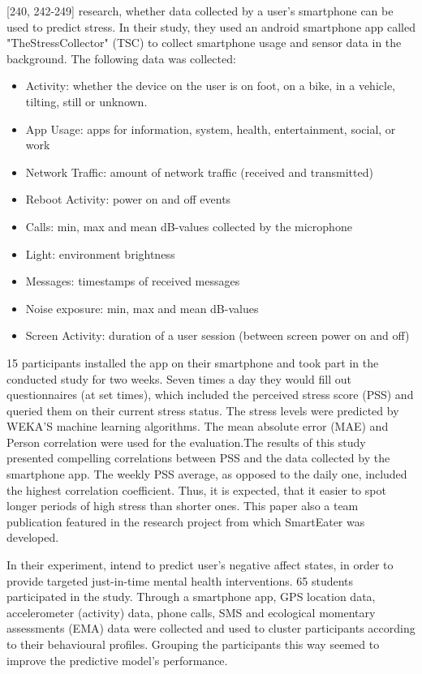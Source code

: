 \textcite{SmartphoneBasedStressPrediction2015}[240, 242-249] research, whether data collected by a user's smartphone can be used to predict stress. In their study, they used an android smartphone app called "TheStressCollector" (TSC) to collect smartphone usage and sensor data in the background. The following data was collected:
\begin{itemize}
  \item Activity: whether the device on the user is on foot, on a bike, in a vehicle, tilting, still or unknown.
  \item App Usage: apps for information, system, health, entertainment, social, or work
  \item Network Traffic: amount of network traffic (received and transmitted)
  \item Reboot Activity: power on and off events
  \item Calls: min, max and mean dB-values collected by the microphone
  \item Light: environment brightness
  \item Messages: timestamps of received messages
  \item Noise exposure: min, max and mean dB-values
  \item Screen Activity: duration of a user session (between screen power on and off)
\end{itemize}

15 participants installed the app on their smartphone and took part in the conducted study for two weeks. Seven times a day they would fill out questionnaires (at set times), which included the perceived stress score (PSS) and queried them on their current stress status. The stress levels were predicted by WEKA'S machine learning algorithms. The mean absolute error (MAE) and Person correlation were used for the evaluation.The results of this study presented compelling correlations between PSS and the data collected by the smartphone app. The weekly PSS average, as opposed to the daily one, included the highest correlation coefficient. Thus, it is expected, that it easier to spot longer periods of high stress than shorter ones. 
This paper also a team publication featured in the research project from which SmartEater was developed.

In their experiment, \textcite{ClusterPassivelySensedData2018} intend to predict user's negative affect states, in order to provide targeted just-in-time mental health interventions. 65 students participated in the study. Through a smartphone app, GPS location data, accelerometer (activity) data, phone calls, SMS and ecological momentary assessments (EMA) data were collected and used to cluster participants according to their behavioural profiles. Grouping the participants this way seemed to improve the predictive model's performance.



